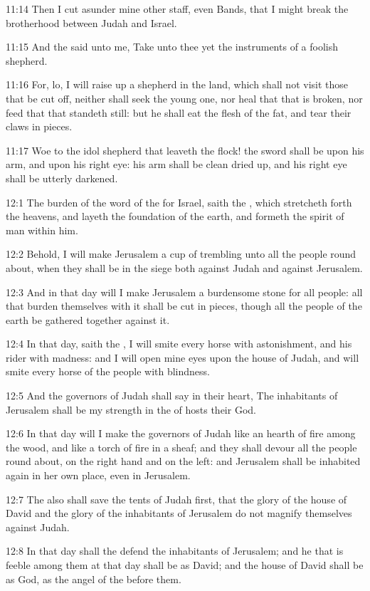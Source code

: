 11:14 Then I cut asunder mine other staff, even Bands, that I might
break the brotherhood between Judah and Israel.

11:15 And the \LORD said unto me, Take unto thee yet the instruments of
a foolish shepherd.

11:16 For, lo, I will raise up a shepherd in the land, which shall not
visit those that be cut off, neither shall seek the young one, nor
heal that that is broken, nor feed that that standeth still: but he
shall eat the flesh of the fat, and tear their claws in pieces.

11:17 Woe to the idol shepherd that leaveth the flock! the sword shall
be upon his arm, and upon his right eye: his arm shall be clean dried
up, and his right eye shall be utterly darkened.

12:1 The burden of the word of the \LORD for Israel, saith the \LORD,
which stretcheth forth the heavens, and layeth the foundation of the
earth, and formeth the spirit of man within him.

12:2 Behold, I will make Jerusalem a cup of trembling unto all the
people round about, when they shall be in the siege both against Judah
and against Jerusalem.

12:3 And in that day will I make Jerusalem a burdensome stone for all
people: all that burden themselves with it shall be cut in pieces,
though all the people of the earth be gathered together against it.

12:4 In that day, saith the \LORD, I will smite every horse with
astonishment, and his rider with madness: and I will open mine eyes
upon the house of Judah, and will smite every horse of the people with
blindness.

12:5 And the governors of Judah shall say in their heart, The
inhabitants of Jerusalem shall be my strength in the \LORD of hosts
their God.

12:6 In that day will I make the governors of Judah like an hearth of
fire among the wood, and like a torch of fire in a sheaf; and they
shall devour all the people round about, on the right hand and on the
left: and Jerusalem shall be inhabited again in her own place, even in
Jerusalem.

12:7 The \LORD also shall save the tents of Judah first, that the glory
of the house of David and the glory of the inhabitants of Jerusalem do
not magnify themselves against Judah.

12:8 In that day shall the \LORD defend the inhabitants of Jerusalem;
and he that is feeble among them at that day shall be as David; and
the house of David shall be as God, as the angel of the \LORD before
them.

